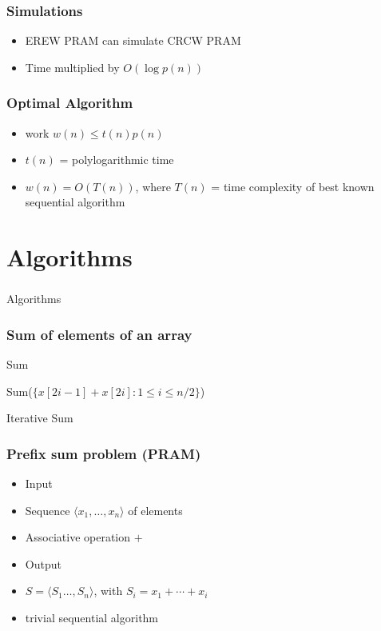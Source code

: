 \documentclass[12pt,aspectratio=169]{beamer}
\begin{document}
\begin{frame}\frametitle{Simulations}
\begin{itemize}
\item
  EREW PRAM can simulate CRCW PRAM
\item
  Time multiplied by $O(\log p(n))$
\end{itemize}
\end{frame}


\begin{frame}\frametitle{Optimal Algorithm}
\begin{itemize}
\item
  \alert{work} $w(n) \le t(n) p(n)$
\item
  $t(n)$ = polylogarithmic time
\item
  $w(n) = O(T(n))$, where $T(n)$ = time complexity of \alert{best known}
  sequential algorithm
\end{itemize}
\end{frame}



\section{Algorithms}


\begin{frame}\frametitle{}
  \begin{center}
    \Huge
    Algorithms
  \end{center}
\end{frame}
\begin{frame}\frametitle{Sum of elements of an array}
\begin{algorithm}[H]
\caption{Sum}
\end{algorithm}

\begin{algorithm}[H]
\Return Sum($\{x[2i-1] + x[2i] : 1\le i\le n/2\}$)
\caption{Iterative Sum}
\end{algorithm}
\end{frame}


\begin{frame}\frametitle{Prefix sum problem (PRAM)}
  \begin{itemize}
  \item
    Input
  \item
    Sequence $\langle x_{1}, \ldots , x_{n} \rangle$ of elements
  \item
    Associative operation $+$
  \item
    Output
  \item
     $S=\langle S_{1}  \ldots , S_{n} \rangle$, with $S_{i} = x_{1} +
     \cdots + x_{i}$
   \item
     trivial sequential algorithm
  \end{itemize}
\end{frame}
\end{document}
